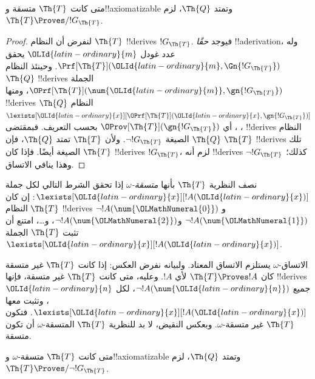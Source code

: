 \documentclass[../../../include/open-logic-section]{subfiles}
\begin{document}
\begin{lem}
متى كانت $\Th{T}$ متسقة و!!{axiomatizable} وتمتد $\Th{Q}$،
لزم $\Th{T}\Proves/ !G_\Th{T}$.
\end{lem}

\begin{proof}
لنفرض أن النظام $\Th{T}$ !!{derive}s $!G_\Th{T}$.
فيوجد \emph{حقًا} !!a{derivation}، وله عدد غودل ${\OLId{latin-ordinary}{m}}$ يحقق
$\Prf[\Th{T}]({\OLId{latin-ordinary}{m}},\Gn{!G_\Th{T}})$. وحينئذ النظام $\Th{Q}$
!!{derive}s الجملة $\OPrf[\Th{T}](\num {\OLId{latin-ordinary}{m}},\gn{!G_\Th{T}})$،
ومنها !!{derive}s النظام $\Th{Q}$
$\lexists[{\OLId{latin-ordinary}{x}}][\OPrf[\Th{T}]({\OLId{latin-ordinary}{x}},\gn{!G_\Th{T}})]$،
أي $\OProv[\Th{T}](\gn{!G_\Th{T}})$ بحسب التعريف.
فبمقتضى ، !!{derive}s النظام $\Th{Q}$
الصيغة $\lnot !G_\Th{T}$. ولأن $\Th{T}$ تمتد $\Th{Q}$،
فإن $\Th{T}$ !!{derive}s تلك الصيغة أيضًا.
فإذا كان $\Th{T}$ !!{derive}s $!G_\Th{T}$، لزم أنه !!{derive}s
$\lnot !G_\Th{T}$ كذلك؛ وهذا ينافي الاتساق.
\end{proof}

\begin{defn}
نصف النظرية $\Th{T}$ بأنها \emph{متسقة-$\omega$} إذا تحقق الشرط
التالي لكل جملة $\lexists[{\OLId{latin-ordinary}{x}}][!A({\OLId{latin-ordinary}{x}})]$: إن كان النظام $\Th{T}$
!!{derive}s $\lnot !A(\num {\OLMathNumeral{0}})$ و$\lnot !A(\num {\OLMathNumeral{1}})$ و$\lnot !A(\num {\OLMathNumeral{2}})$،
و\dots، امتنع أن تثبت $\Th{T}$ الجملة $\lexists[{\OLId{latin-ordinary}{x}}][!A({\OLId{latin-ordinary}{x}})]$.
\end{defn}

الاتساق-$\omega$ يستلزم الاتساق المعتاد. ولبيانه نفرض العكس:
إذا كانت $\Th{T}$ غير متسقة كان $\Th{T}\Proves !A$ لأي $!A$.
وعليه، متى كانت $\Th{T}$ غير متسقة، فإنها !!{derive}s جميع
$\lnot !A(\num {\OLId{latin-ordinary}{n}})$، لكل ${\OLId{latin-ordinary}{n}}$، وتثبت معها
$\lexists[{\OLId{latin-ordinary}{x}}][!A({\OLId{latin-ordinary}{x}})]$. فتكون $\Th{T}$ غير متسقة-$\omega$.
وبعكس النقيض، لا بد للنظرية $\Th{T}$ المتسقة-$\omega$ أن تكون
متسقة.

\begin{lem}
متى كانت $\Th{T}$ متسقة-$\omega$ و!!{axiomatizable} وتمتد
$\Th{Q}$، لزم $\Th{T}\Proves/\lnot !G_\Th{T}$.
\end{lem}
\end{document}
